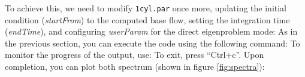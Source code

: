 \markdownRendererDocumentBegin
To achieve this, we need to modify \texttt{1cyl.par} once more, updating the initial condition (\textit{startFrom}) to the computed base flow, setting the integration time (\textit{endTime}), and configuring \textit{userParam} for the direct eigenproblem mode:\markdownRendererInterblockSeparator
{}\markdownRendererInterblockSeparator
{}\hline \bigskip As in the previous section, you can execute the code using the following command:\markdownRendererInterblockSeparator
{}\markdownRendererInterblockSeparator
{}To monitor the progress of the output, use:\markdownRendererInterblockSeparator
{}\markdownRendererInterblockSeparator
{}To exit, press ``Ctrl+c''.\markdownRendererInterblockSeparator
{}Upon completion, you can plot both spectrum (shown in figure \ref{fig:spectra}):\markdownRendererInterblockSeparator
{}\markdownRendererDocumentEnd